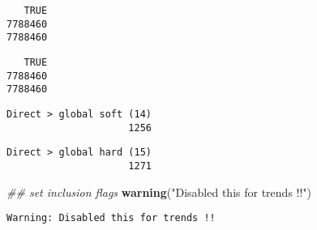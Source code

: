 \documentclass[
  10pt,
  a4paper,oneside]{article}
\newenvironment{Shaded}{\begin{snugshade}}{\end{snugshade}}
\newcommand{\AlertTok}[1]{\textcolor[rgb]{0.94,0.16,0.16}{#1}}
\newcommand{\CommentTok}[1]{\textcolor[rgb]{0.56,0.35,0.01}{\textit{#1}}}
\newcommand{\DecValTok}[1]{\textcolor[rgb]{0.00,0.00,0.81}{#1}}
\newcommand{\KeywordTok}[1]{\textcolor[rgb]{0.13,0.29,0.53}{\textbf{#1}}}
\newcommand{\NormalTok}[1]{#1}
\newcommand{\OperatorTok}[1]{\textcolor[rgb]{0.81,0.36,0.00}{\textbf{#1}}}
\newcommand{\StringTok}[1]{\textcolor[rgb]{0.31,0.60,0.02}{#1}}
\begin{document}
\begin{verbatim}
   TRUE 
7788460 
7788460
\end{verbatim}

\begin{Shaded}
\end{Shaded}

\begin{verbatim}
   TRUE 
7788460 
7788460
\end{verbatim}

\begin{Shaded}
\end{Shaded}

\begin{verbatim}
Direct > global soft (14) 
                     1256 
\end{verbatim}

\begin{Shaded}
\end{Shaded}

\begin{verbatim}
Direct > global hard (15) 
                     1271 
\end{verbatim}

\begin{Shaded}
\begin{Highlighting}[]
\CommentTok{\#\# set inclusion flags}
\KeywordTok{warning}\NormalTok{(}\StringTok{"Disabled this for trends !!"}\NormalTok{)}
\end{Highlighting}
\end{Shaded}

\begin{verbatim}
Warning: Disabled this for trends !!
\end{verbatim}
\end{document}

